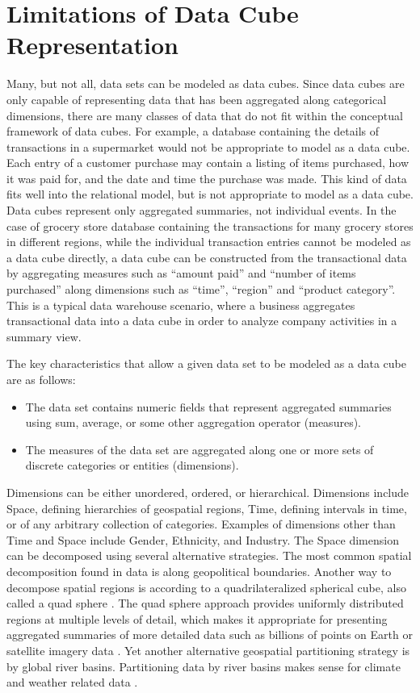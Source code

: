 \section{Limitations of Data Cube Representation}
Many, but not all, data sets can be modeled as data cubes. Since data cubes are only capable of representing data that has been aggregated along categorical dimensions, there are many classes of data that do not fit within the conceptual framework of data cubes. For example, a database containing the details of transactions in a supermarket would not be appropriate to model as a data cube. Each entry of a customer purchase may contain a listing of items purchased, how it was paid for, and the date and time the purchase was made. This kind of data fits well into the relational model, but is not appropriate to model as a data cube. Data cubes represent only aggregated summaries, not individual events. In the case of grocery store database containing the transactions for many grocery stores in different regions, while the individual transaction entries cannot be modeled as a data cube directly, a data cube can be constructed from the transactional data by aggregating measures such as ``amount paid'' and ``number of items purchased'' along dimensions such as ``time'', ``region'' and ``product category''. This is a typical data warehouse scenario, where a business aggregates transactional data into a data cube in order to analyze company activities in a summary view.

The key characteristics that allow a given data set to be modeled as a data cube are as follows:

\begin{itemize}
\item The data set contains numeric fields that represent aggregated summaries using sum, average, or some other aggregation operator (measures).
\item The measures of the data set are aggregated along one or more sets of discrete categories or entities (dimensions).
\end{itemize}

Dimensions can be either unordered, ordered, or hierarchical. Dimensions include Space, defining hierarchies of geospatial regions, Time, defining intervals in time, or of any arbitrary collection of categories. Examples of dimensions other than Time and Space include Gender, Ethnicity, and Industry. The Space dimension can be decomposed using several alternative strategies. The most common spatial decomposition found in data is along geopolitical boundaries. Another way to decompose spatial regions is according to a quadrilateralized spherical cube, also called a quad sphere \cite{tobler1986quadtree}. The quad sphere approach provides uniformly distributed regions at multiple levels of detail, which makes it appropriate for presenting aggregated summaries of more detailed data such as billions of points on Earth or satellite imagery data \cite{white1992quadrilateralized}. Yet another alternative geospatial partitioning strategy is by global river basins. Partitioning data by river basins makes sense for climate and weather related data \cite{worldbank2014climate}.

